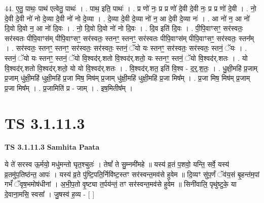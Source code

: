 \documentclass[17pt]{extarticle}
\begin{document}
44. ए॒तु॒ पाथः॒ पाथ॑ एत्वेतु॒ पाथः॑ । . पाथ॒ इति॒ पाथः॑ । . प्र णो॑ नः॒ प्र प्र णो॑ दे॒वी दे॒वी नः॒ प्र प्र णो॑ दे॒वी । . नो॒ दे॒वी दे॒वी नो॑ नो दे॒व्या दे॒वी नो॑ नो दे॒व्या । . दे॒व्या दे॒वी दे॒व्या नो॑ न॒ आ दे॒वी दे॒व्या नः॑ । . आ नो॑ न॒ आ नो॑ दि॒वो दि॒वो न॒ आ नो॑ दि॒वः । . नो॒ दि॒वो दि॒वो नो॑ नो दि॒वः । . दि॒व इति॑ दि॒वः । . पी॒पि॒वाꣳसꣳ॒॒ सर॑स्वतः॒ सर॑स्वतः पीपि॒वाꣳस॑म् पीपि॒वाꣳसꣳ॒॒ सर॑स्वतः॒ स्तनꣳ॒॒ स्तनꣳ॒॒ सर॑स्वतः पीपि॒वाꣳस॑म् पीपि॒वाꣳसꣳ॒॒ सर॑स्वतः॒ स्तन᳚म् । . सर॑स्वतः॒ स्तनꣳ॒॒ स्तनꣳ॒॒ सर॑स्वतः॒ सर॑स्वतः॒ स्तनं॒ ॅयो यः स्तनꣳ॒॒ सर॑स्वतः॒ सर॑स्वतः॒ स्तनं॒ ॅयः । . स्तनं॒ ॅयो यः स्तनꣳ॒॒ स्तनं॒ ॅयो वि॒श्वद॑र्.शतो वि॒श्वद॑र्.शतो॒ यः स्तनꣳ॒॒ स्तनं॒ ॅयो वि॒श्वद॑र्.शतः । . यो वि॒श्वद॑र्.शतो वि॒श्वद॑र्.शतो॒ यो यो वि॒श्वद॑र्.शतः । . वि॒श्वद॑र्.शत॒ इति॑ वि॒श्व - द॒र्॒.श॒तः॒ । . धु॒क्षी॒महि॑ प्र॒जाम् प्र॒जाम् धु॑क्षी॒महि॑ धुक्षी॒महि॑ प्र॒जा मिष॒ मिष॑म् प्र॒जाम् धु॑क्षी॒महि॑ धुक्षी॒महि॑ प्र॒जा मिष᳚म् । . प्र॒जा मिष॒ मिष॑म् प्र॒जाम् प्र॒जा मिष᳚म् । . प्र॒जामिति॑ प्र - जाम् । . इष॒मितीष᳚म् । \newline
\pagebreak
{}

\section{ TS 3.1.11.3 }

\textbf{TS 3.1.11.3 } \newline
\textbf{Samhita Paata} \newline

ये ते॑ सरस्व ऊ॒र्मयो॒ मधु॑मन्तो घृत॒श्चुतः॑ । तेषां᳚ ते सु॒म्नमी॑महे ॥ यस्य॑ व्र॒तं प॒शवो॒ यन्ति॒ सर्वे॒ यस्य॑ व्र॒तमु॑प॒तिष्ठ॑न्त॒ आपः॑ । यस्य॑ व्र॒ते पु॑ष्टि॒पति॒र्निवि॑ष्ट॒स्तꣳ सर॑स्वन्त॒मव॑से हुवेम ॥ दि॒व्यꣳ सु॑प॒र्णं ॅव॑य॒सं बृ॒हन्त॑म॒पां गर्भं॑ ॅवृष॒भमोष॑धीनां । अ॒भी॒प॒तो वृ॒ष्ट्या त॒र्पय॑न्तं॒ तꣳ सर॑स्वन्त॒मव॑से हुवेम ॥ सिनी॑वालि॒ पृथु॑ष्टुके॒ या दे॒वाना॒मसि॒ स्वसा᳚ । जु॒षस्व॑ ह॒व्य - [  ] \newline
\end{document}
